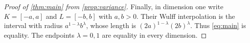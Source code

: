 \begin{proof}[Proof of \cref{thm:main} from \cref{prop:variance}]
Finally, in dimension one write $K=[-a,a]$ and $L=[-b,b]$ with $a,b>0$. Their Wulff interpolation is the interval with radius $a^{1-\lambda}b^\lambda$, whose length is $(2a)^{1-\lambda}(2b)^\lambda$. Thus \eqref{eq:main} is equality. The endpoints $\lambda=0,1$ are equality in every dimension.
\end{proof}
